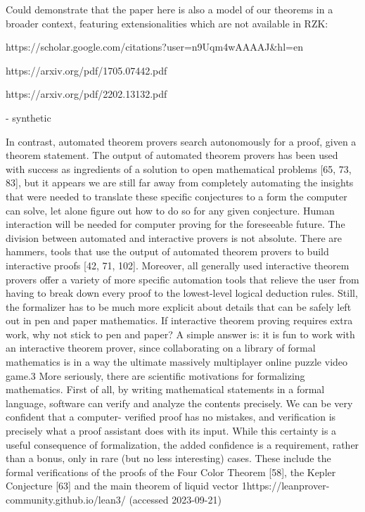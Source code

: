 \documentclass{book}
\theoremstyle{definition}
\begin{document}
Could demonstrate that the paper here is also a model of our theorems in a broader context, featuring extensionalities which are not available in RZK:

https://scholar.google.com/citations?user=n9Uqm4wAAAAJ&hl=en

https://arxiv.org/pdf/1705.07442.pdf

https://arxiv.org/pdf/2202.13132.pdf

- synthetic

In contrast, automated theorem provers search autonomously for a proof, given a theorem statement. The output of automated theorem provers has been used with success as ingredients of a solution to open mathematical problems [65, 73, 83], but it appears we are still far away from completely automating the insights that were needed to translate these specific conjectures to a form the computer can solve, let alone figure out how to do so for any given conjecture. Human interaction will be needed for computer proving for the foreseeable future.
The division between automated and interactive provers is not absolute. There are hammers, tools that use the output of automated theorem provers to build interactive proofs [42, 71, 102]. Moreover, all generally used interactive theorem provers offer a variety of more specific automation tools that relieve the user from having to break down every proof to the lowest-level logical deduction rules. Still, the formalizer has to be much more explicit about details that can be safely left out in pen and paper mathematics.
If interactive theorem proving requires extra work, why not stick to pen and paper? A simple answer is: it is fun to work with an interactive theorem prover, since collaborating on a library of formal mathematics is in a way the ultimate massively multiplayer online puzzle video game.3
More seriously, there are scientific motivations for formalizing mathematics. First of all, by writing mathematical statements in a formal language, software can verify and analyze the contents precisely. We can be very confident that a computer- verified proof has no mistakes, and verification is precisely what a proof assistant does with its input. While this certainty is a useful consequence of formalization, the added confidence is a requirement, rather than a bonus, only in rare (but no less interesting) cases. These include the formal verifications of the proofs of the Four Color Theorem [58], the Kepler Conjecture [63] and the main theorem of liquid vector
 1https://leanprover-community.github.io/lean3/ (accessed 2023-09-21)
\end{document}
